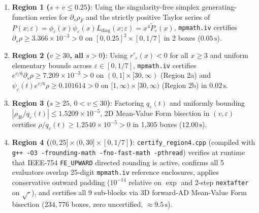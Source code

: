 \documentclass[11pt,a4paper]{article}
\theoremstyle{remark}
\begin{document}
\begin{enumerate}
  \item \textbf{Region 1 ($s+v\le 0.25$)}: Using the singularity-free simplex generating-function series for $\partial_s\rho_F$ and the strictly positive Taylor series of $P(x;\varepsilon)=\phi_\varepsilon(x)\psi_\varepsilon(x)L_{\mathrm{diag}}(x;\varepsilon)=x^4\tilde{P}_\varepsilon(x)$, \texttt{mpmath.iv} certifies $\partial_s\rho \ge 3.366\times 10^{-3} > 0$ on $[0,0.25]^2\times[0,1/7]$ in 2 boxes ($0.05\,\mathrm{s}$).
  \item \textbf{Region 2 ($v\ge 30$, all $s>0$)}: Using $r'_\varepsilon(x)<0$ for all $x\ge 3$ and uniform elementary bounds across $\varepsilon\in[0,1/7]$, \texttt{mpmath.iv} certifies $e^{v/6}\partial_s\rho \ge 7.209\times 10^{-3} > 0$ on $(0,1]\times[30,\infty)$ (Region 2a) and $\psi_\varepsilon(t)e^{v/6}\rho \ge 0.101614 > 0$ on $[1,\infty)\times[30,\infty)$ (Region 2b) in $0.02\,\mathrm{s}$.
  \item \textbf{Region 3 ($s\ge 25,\, 0<v\le 30$)}: Factoring $q_\varepsilon(t)$ and uniformly bounding $|\rho_{3b}/q_\varepsilon(t)| \le 1.5209\times 10^{-5}$, 2D Mean-Value Form bisection in $(v,\varepsilon)$ certifies $\rho/q_\varepsilon(t) \ge 1.2540\times 10^{-5} > 0$ in 1,305 boxes ($12.00\,\mathrm{s}$).
  \item \textbf{Region 4 ($(0,25]\times(0,30]\times[0,1/7]$)}: \texttt{certify\_region4.cpp} (compiled with \texttt{g++ -O3 -frounding-math -fno-fast-math -pthread}) verifies at runtime that IEEE-754 \texttt{FE\_UPWARD} directed rounding is active, confirms all 5 evaluators overlap 25-digit \texttt{mpmath.iv} reference enclosures, applies conservative outward padding ($10^{-14}$ relative on $\exp$ and 2-step \texttt{nextafter} on $\sqrt{\cdot}$), and certifies all 9 sub-blocks via 3D forward-AD Mean-Value Form bisection ($234{,}776$ boxes, zero uncertified, $\approx 9.5\,\mathrm{s}$).
\end{enumerate}
\end{document}
